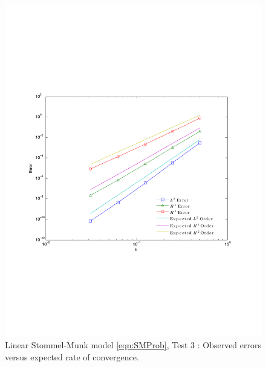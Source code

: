 \begin{figure}
  \begin{center}
    \includegraphics[scale=0.5]{Figures/SMsinConvergence.pdf}
    \caption{Linear Stommel-Munk model \eqref{eqn:SMProb}, Test 3 \cite{Cascon}:
      Observed errors versus expected rate of convergence.}
    \label{fig:SMSinErrors}
  \end{center}
\end{figure}

